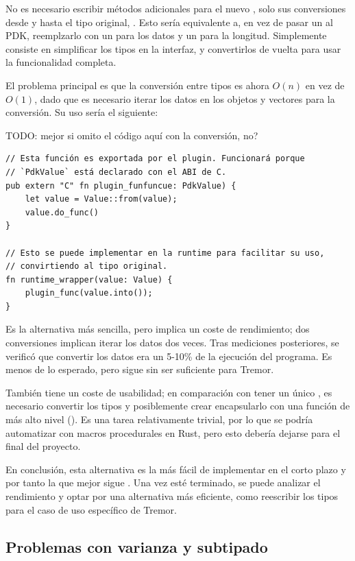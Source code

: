 No es necesario escribir métodos adicionales para el nuevo , solo
sus conversiones desde y hasta el tipo original, . Esto sería
equivalente a, en vez de pasar un  al PDK, reemplzarlo con un
 para los datos y un  para la longitud. Simplemente
consiste en simplificar los tipos en la interfaz, y convertirlos de vuelta para
usar la funcionalidad completa.

El problema principal es que la conversión entre tipos es ahora $O(n)$ en vez de
$O(1)$, dado que es necesario iterar los datos en los objetos y vectores para la
conversión. Su uso sería el siguiente:

TODO: mejor si omito el código aquí con la conversión, no?

\begin{verbatim}
// Esta función es exportada por el plugin. Funcionará porque
// `PdkValue` está declarado con el ABI de C.
pub extern "C" fn plugin_funfuncue: PdkValue) {
    let value = Value::from(value);
    value.do_func()
}

// Esto se puede implementar en la runtime para facilitar su uso,
// convirtiendo al tipo original.
fn runtime_wrapper(value: Value) {
    plugin_func(value.into());
}
\end{verbatim}

Es la alternativa más sencilla, pero implica un coste de rendimiento; dos
conversiones implican iterar los datos dos veces. Tras mediciones posteriores,
se verificó que convertir los datos era un 5-10\% de la ejecución del programa.
Es menos de lo esperado, pero sigue sin ser suficiente para Tremor.

También tiene un coste de usabilidad; en comparación con tener un único
, es necesario convertir los tipos y posiblemente crear encapsularlo
con una función de más alto nivel (). Es una tarea
relativamente trivial, por lo que se podría automatizar con macros procedurales
en Rust, pero esto debería dejarse para el final del proyecto.

En conclusión, esta alternativa es la más fácil de implementar en el corto
plazo y por tanto la que mejor sigue \work. Una vez esté terminado, se puede
analizar el rendimiento y optar por una alternativa más eficiente, como
reescribir los tipos para el caso de uso específico de Tremor.

\subsection{Problemas con varianza y subtipado}

